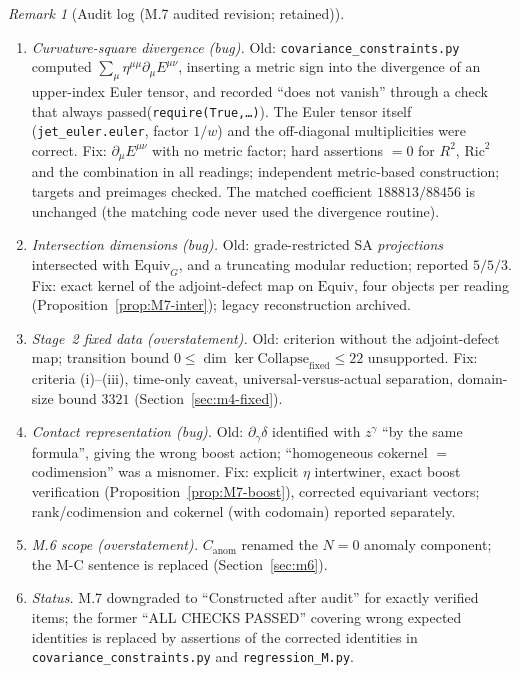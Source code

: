 \documentclass{article}
\theoremstyle{remark}
\newtheorem{remark}[proposition]{Remark}
\newcommand{\Coll}{\mathrm{Collapse}}
\begin{document}
\begin{remark}[Audit log (M.7 audited revision; retained)]
\label{rem:M7-audit}
\begin{enumerate}
\item \emph{Curvature-square divergence (bug).} Old: \texttt{covariance\_constraints.py} computed $\sum_\mu\eta^{\mu\mu}\partial_\mu E^{\mu\nu}$, inserting a metric sign into the divergence of an upper-index Euler tensor, and recorded ``does not vanish'' through a check that always passed\linebreak[1] (\texttt{require(True,}\allowbreak\texttt{\ldots)}). The Euler tensor itself (\texttt{jet\_euler.euler}, factor $1/w$) and the off-diagonal multiplicities were correct. Fix: $\partial_\mu E^{\mu\nu}$ with no metric factor; hard assertions $=0$ for $R^2$, $\mathrm{Ric}^2$ and the combination in all readings; independent metric-based construction; targets and preimages checked. The matched coefficient $188813/88456$ is unchanged (the matching code never used the divergence routine).
\item \emph{Intersection dimensions (bug).} Old: grade-restricted SA \emph{projections} intersected with $\mathrm{Equiv}_G$, and a truncating modular reduction; reported $5/5/3$. Fix: exact kernel of the adjoint-defect map on $\mathrm{Equiv}$, four objects per reading (Proposition~\ref{prop:M7-inter}); legacy reconstruction archived.
\item \emph{Stage~2 fixed data (overstatement).} Old: criterion without the adjoint-defect map; transition bound $0\le\dim\ker\Coll_{\mathrm{fixed}}\le22$ unsupported. Fix: criteria (i)--(iii), time-only caveat, universal-versus-actual separation, domain-size bound $3321$ (Section~\ref{sec:m4-fixed}).
\item \emph{Contact representation (bug).} Old: $\partial_\gamma\delta$ identified with $z^\gamma$ ``by the same formula'', giving the wrong boost action; ``homogeneous cokernel $=$ codimension'' was a misnomer. Fix: explicit $\eta$ intertwiner, exact boost verification (Proposition~\ref{prop:M7-boost}), corrected equivariant vectors; rank/codimension and cokernel (with codomain) reported separately.
\item \emph{M.6 scope (overstatement).} $C_{\mathrm{anom}}$ renamed the $N=0$ anomaly component; the M-C sentence is replaced (Section~\ref{sec:m6}).
\item \emph{Status.} M.7 downgraded to ``Constructed after audit'' for exactly verified items; the former ``ALL CHECKS PASSED'' covering wrong expected identities is replaced by assertions of the corrected identities in \texttt{covariance\_constraints.py} and \texttt{regression\_M.py}.
\end{enumerate}
\end{remark}
\end{document}
